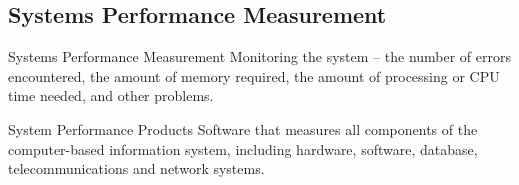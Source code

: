 \documentclass[\main/notes.tex]{subfiles}
\begin{document}
			\subsection{Systems Performance Measurement}
				\begin{definition}{Systems Performance Measurement}
					Monitoring the system -- the number of errors encountered, the amount of memory required, the amount of processing or CPU time needed, and other problems.
				\end{definition}
				\begin{definition}{System Performance Products}
					Software that measures all components of the computer-based information system, including hardware, software, database, telecommunications and network systems.
				\end{definition}

	\vbox{}
\end{document}
